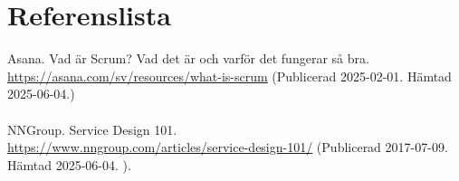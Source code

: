 \section{Referenslista}

Asana. Vad är Scrum? Vad det är och varför det fungerar så bra.\\
\href{https://asana.com/sv/resources/what-is-scrum}{https://asana.com/sv/resources/what-is-scrum} (Publicerad 2025-02-01. Hämtad 2025-06-04.)
\\
\\
NNGroup. Service Design 101. \\
\href{https://www.nngroup.com/articles/service-design-101/}{https://www.nngroup.com/articles/service-design-101/} (Publicerad 2017-07-09. Hämtad 2025-06-04. ).